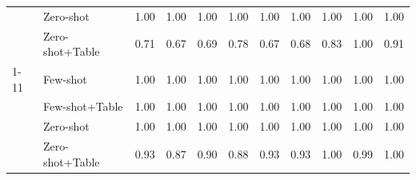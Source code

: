 \begin{table}[htbp]
\begin{tabular}{@{}llccccccccc@{}}
 & Zero-shot & 1.00 & 1.00 & 1.00 & 1.00 & 1.00 & 1.00 & 1.00 & 1.00 & 1.00 \\
 & Zero-shot+Table & 0.71 & 0.67 & 0.69 & 0.78 & 0.67 & 0.68 & 0.83 & 1.00 & 0.91 \\
\cmidrule(lr){1-11}
\multirow{4}{*}{Mistral-Small} & Few-shot & 1.00 & 1.00 & 1.00 & 1.00 & 1.00 & 1.00 & 1.00 & 1.00 & 1.00 \\
 & Few-shot+Table & 1.00 & 1.00 & 1.00 & 1.00 & 1.00 & 1.00 & 1.00 & 1.00 & 1.00 \\
 & Zero-shot & 1.00 & 1.00 & 1.00 & 1.00 & 1.00 & 1.00 & 1.00 & 1.00 & 1.00 \\
 & Zero-shot+Table & 0.93 & 0.87 & 0.90 & 0.88 & 0.93 & 0.93 & 1.00 & 0.99 & 1.00 \\
\bottomrule
\end{tabular}
\end{table}